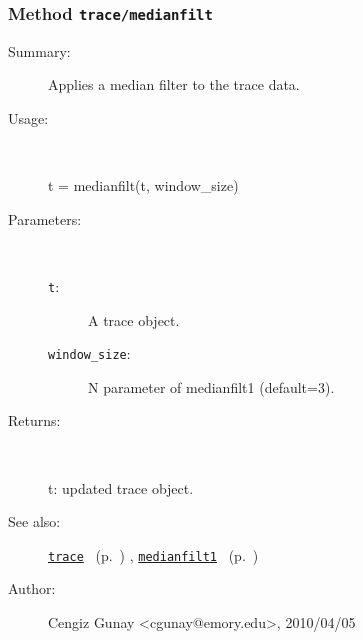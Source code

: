 \subsubsection[Method \texttt{medianfilt}]{Method \texttt{trace/medianfilt}}%
%
\label{ref_trace__medianfilt}%
\hypertarget{ref_trace__medianfilt}{}%
\begin{description}
\item[Summary:]Applies a median filter to the trace data.
%
\item[Usage:]~%
\begin{lyxcode}%
t = medianfilt(t, window\_size)
%
\end{lyxcode}%
%
%
\item[Parameters:]~
\begin{description}%
\item[\texttt{t}:]
 A trace object.
\item[\texttt{window\_size}:]
 N parameter of medianfilt1 (default=3).
\end{description}%
%
\item[Returns:
]~

   t: updated trace object.
%
%
\item[See also:]%
\hyperlink{ref_trace}{\texttt{trace}}%
\ (p.~\pageref{ref_trace})%
%
, \hyperlink{ref_medianfilt1}{\texttt{medianfilt1}}%
\ (p.~\pageref{ref_medianfilt1})%
%
%
\item[Author:]%
Cengiz Gunay <cgunay@emory.edu>, 2010/04/05
%
\end{description}
\methodline%
